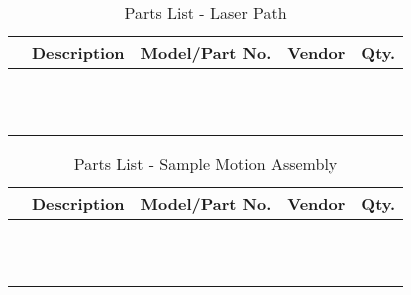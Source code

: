 \begin{table}[htbp]
    \renewcommand{\arraystretch}{1.25}
    \caption{Parts List - Laser Path}
    \begin{center}
        \begin{tabular}{ l l l l l }
        \toprule[2pt]
        \textbf{} & \textbf{Description} & \textbf{Model/Part No.}  & \textbf{Vendor} & \textbf{Qty.} \\
        \midrule[0.75pt]
        &  &  &  &  \\
        &  &  &  &  \\
        &  &  &  &  \\
        &  &  &  &  \\
        &  &  &  &  \\
        &  &  &  &  \\
        &  &  &  &  \\
        &  &  &  &  \\
        &  &  &  &  \\
        &  &  &  &  \\
        &  &  &  &  \\
        \bottomrule[2pt]
        \end{tabular}
        \label{tab:parts_list_counterweight}
    \end{center}
\end{table}

\begin{table}[htbp]
    \renewcommand{\arraystretch}{1.25}
    \caption{Parts List - Sample Motion Assembly}
    \begin{center}
        \begin{tabular}{ l l l l l }
        \toprule[2pt]
        \textbf{} & \textbf{Description} & \textbf{Model/Part No.}  & \textbf{Vendor} & \textbf{Qty.} \\
        \midrule[0.75pt]
        &  &  &  &  \\
        &  &  &  &  \\
        &  &  &  &  \\
        &  &  &  &  \\
        &  &  &  &  \\
        &  &  &  &  \\
        &  &  &  &  \\
        &  &  &  &  \\
        &  &  &  &  \\
        &  &  &  &  \\
        &  &  &  &  \\
        \bottomrule[2pt]
        \end{tabular}
        \label{tab:parts_list_sample_motion_assy}
    \end{center}
\end{table}

